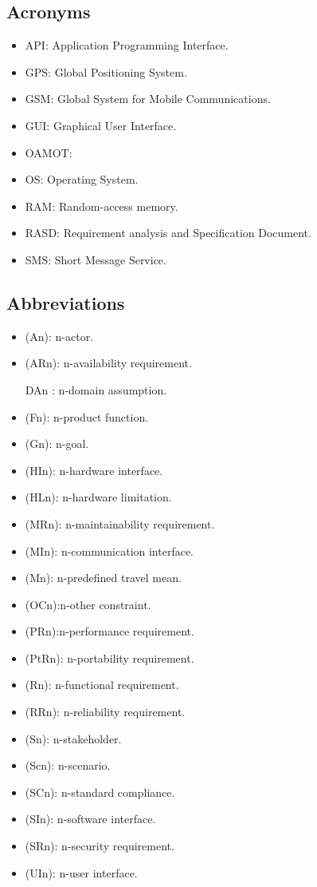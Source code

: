 \documentclass[a4paper,leqno]{book}
\begin{document}
\subsection{Acronyms}
\begin{itemize}
	\item API: Application Programming Interface.
	\item GPS: Global Positioning System.
	\item GSM: Global System for Mobile Communications.
	\item GUI: Graphical User Interface.
	\item OAMOT:
	\item OS: Operating System.
	\item RAM: Random-access memory.
	\item RASD: Requirement analysis and Specification Document.
	\item SMS: Short Message Service.
\end{itemize}


\subsection{Abbreviations}
\begin{itemize}
	\item (An): n-actor.
	\item (ARn): n-availability requirement.
	\item [DAn]: n-domain assumption.
	\item (Fn): n-product function.	
	\item (Gn): n-goal.
	\item (HIn): n-hardware interface.
	\item (HLn): n-hardware limitation.
	\item (MRn): n-maintainability requirement.
	\item (MIn): n-communication interface.
	\item (Mn): n-predefined travel mean.
	\item (OCn):n-other constraint.
	\item (PRn):n-performance requirement.
	\item (PtRn): n-portability requirement.
	\item (Rn): n-functional requirement.
	\item (RRn): n-reliability requirement.
	\item (Sn): n-stakeholder.
	\item (Scn): n-scenario.
	\item (SCn): n-standard compliance.
	\item (SIn): n-software interface.
	\item (SRn): n-security requirement.
	\item (UIn): n-user interface.
	
\end{itemize}
\end{document}
